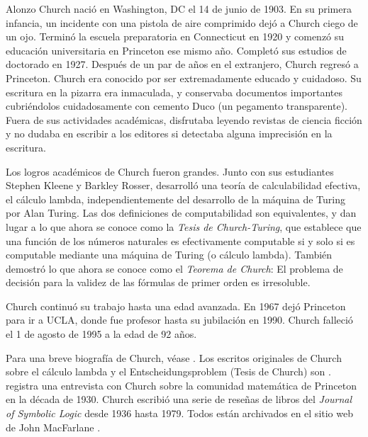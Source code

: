 \documentclass[../../../include/open-logic-section]{subfiles}
\begin{document}



Alonzo Church nació en Washington, DC el 14 de junio de 1903. En su primera infancia, un incidente con una pistola de aire comprimido dejó a Church ciego de un ojo. Terminó la escuela preparatoria en Connecticut en 1920 y comenzó su educación universitaria en Princeton ese mismo año. Completó sus estudios de doctorado en 1927. Después de un par de años en el extranjero, Church regresó a Princeton. Church era conocido por ser extremadamente educado y cuidadoso. Su escritura en la pizarra era inmaculada, y conservaba documentos importantes cubriéndolos cuidadosamente con cemento Duco (un pegamento transparente). Fuera de sus actividades académicas, disfrutaba leyendo revistas de ciencia ficción y no dudaba en escribir a los editores si detectaba alguna imprecisión en la escritura.

Los logros académicos de Church fueron grandes. Junto con sus estudiantes Stephen Kleene y Barkley Rosser, desarrolló una teoría de calculabilidad efectiva, el cálculo lambda, independientemente del desarrollo de la máquina de Turing por Alan Turing. Las dos definiciones de computabilidad son equivalentes, y dan lugar a lo que ahora se conoce como la \emph{Tesis de Church-Turing}, que establece que una función de los números naturales es efectivamente computable si y solo si es computable mediante una máquina de Turing (o cálculo lambda). También demostró lo que ahora se conoce como el \emph{Teorema de Church}: El problema de decisión para la validez de las fórmulas de primer orden es irresoluble.

Church continuó su trabajo hasta una edad avanzada. En 1967 dejó Princeton para ir a UCLA, donde fue profesor hasta su jubilación en 1990. Church falleció el 1 de agosto de 1995 a la edad de 92 años.

\begin{reading}
Para una breve biografía de Church, véase \citet{EndertonND}. Los escritos originales de Church sobre el cálculo lambda y el Entscheidungsproblem (Tesis de Church) son \citet{Church1936,Church1936a}. \citet{Aspray1984} registra una entrevista con Church sobre la comunidad matemática de Princeton en la década de 1930. Church escribió una serie de reseñas de libros del \emph{Journal of Symbolic Logic} desde 1936 hasta 1979. Todos están archivados en el sitio web de John MacFarlane \citep{MacFarlane2015}.
\end{reading}
\end{document}
